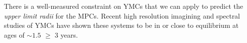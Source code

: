 There is a well-measured constraint on YMCs that we can apply to predict the\textit{ upper limit radii} for the MPCs. Recent high resolution imagining and spectral studies of YMCs have shown these systems to be in or close to equilibrium at ages of $∼1.5$ $\geq$ $3$ years. \cite{Darwin_1900}